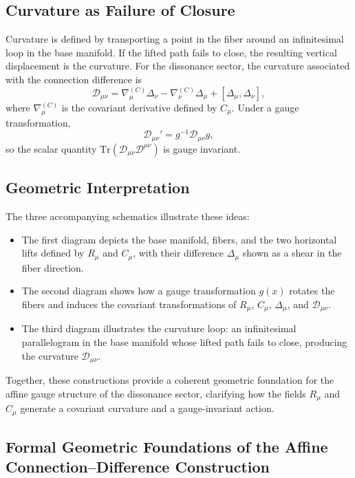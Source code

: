 \documentclass[12pt,openany]{book}
\theoremstyle{plain}
\theoremstyle{definition}
\theoremstyle{remark}
\begin{document}
\subsection*{Curvature as Failure of Closure}

Curvature is defined by transporting a point in the fiber around an
infinitesimal loop in the base manifold. If the lifted path fails to close,
the resulting vertical displacement is the curvature. For the dissonance
sector, the curvature associated with the connection difference is
\[
\mathcal{D}_{\mu\nu}
= \nabla_\mu^{(C)} \Delta_\nu
- \nabla_\nu^{(C)} \Delta_\mu
+ [\Delta_\mu, \Delta_\nu],
\]
where $\nabla_\mu^{(C)}$ is the covariant derivative defined by $C_\mu$.
Under a gauge transformation,
\[
\mathcal{D}_{\mu\nu}' = g^{-1} \mathcal{D}_{\mu\nu} g,
\]
so the scalar quantity $\mathrm{Tr}(\mathcal{D}_{\mu\nu}\mathcal{D}^{\mu\nu})$
is gauge invariant.

\subsection*{Geometric Interpretation}

The three accompanying schematics illustrate these ideas:

\begin{itemize}
    \item The first diagram depicts the base manifold, fibers, and the two
    horizontal lifts defined by $R_\mu$ and $C_\mu$, with their difference
    $\Delta_\mu$ shown as a shear in the fiber direction.

    \item The second diagram shows how a gauge transformation $g(x)$ rotates
    the fibers and induces the covariant transformations of $R_\mu$,
    $C_\mu$, $\Delta_\mu$, and $\mathcal{D}_{\mu\nu}$.

    \item The third diagram illustrates the curvature loop: an infinitesimal
    parallelogram in the base manifold whose lifted path fails to close,
    producing the curvature $\mathcal{D}_{\mu\nu}$.
\end{itemize}

Together, these constructions provide a coherent geometric foundation for
the affine gauge structure of the dissonance sector, clarifying how the
fields $R_\mu$ and $C_\mu$ generate a covariant curvature and a
gauge-invariant action.

\subsection{Formal Geometric Foundations of the Affine Connection--Difference Construction}
\end{document}

